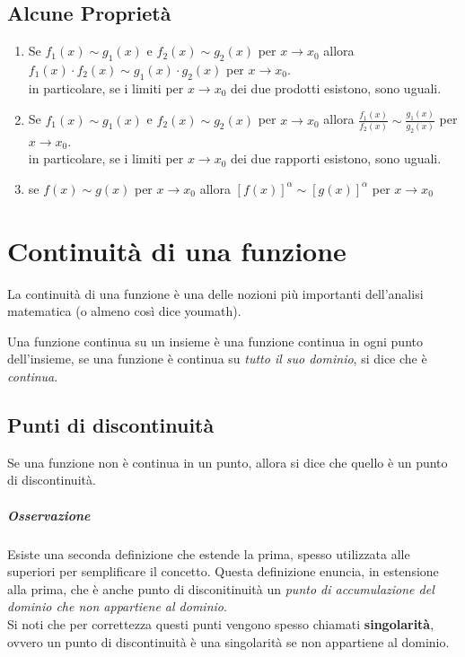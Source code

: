 \documentclass[12pt, a4paper, openany]{book}
\begin{document}
	\subsection*{Alcune Proprietà}
	\begin{enumerate}
		\item Se $f_1(x) \sim g_1(x)$ e $f_2(x) \sim g_2(x)$ per $x \to x_0$ allora $f_1(x) \cdot f_2(x) \sim g_1(x) \cdot g_2(x)$ per $x \to x_0$.
		      \\in particolare, se i limiti per $x \to x_0$ dei due prodotti esistono, sono uguali.
		\item Se $f_1(x) \sim g_1(x)$ e $f_2(x) \sim g_2(x)$ per $x \to x_0$ allora $\frac{f_1(x)}{f_2(x)} \sim \frac{g_1(x)}{g_2(x)}$ per $x \to x_0$.
		      \\in particolare, se i limiti per $x \to x_0$ dei due rapporti esistono, sono uguali.
		\item se $f(x) \sim g(x)$ per $x \to x_0$ allora $[f(x)]^\alpha \sim [g(x)]^\alpha$ per $x \to x_0$
	\end{enumerate}

	\section{Continuità di una funzione}
	La continuità di una funzione è una delle nozioni più importanti dell'analisi matematica (o almeno così dice youmath).
	
	Una funzione continua su un insieme è una funzione continua in ogni punto dell'insieme, se una funzione è continua su \emph{tutto il suo dominio}, si dice che è \emph{continua}.

	\subsection{Punti di discontinuità}
	Se una funzione non è continua in un punto, allora si dice che quello è un punto di discontinuità.

	
	\subparagraph*{Osservazione} Esiste una seconda definizione che estende la prima, spesso utilizzata alle superiori per semplificare il concetto.
	Questa definizione enuncia, in estensione alla prima, che è anche punto di disconitinuità un \emph{punto di accumulazione del dominio che non appartiene al dominio}.
	\\Si noti che per correttezza questi punti vengono spesso chiamati \textbf{singolarità}, ovvero un punto di discontinuità è una singolarità se non appartiene al dominio.
\end{document}
